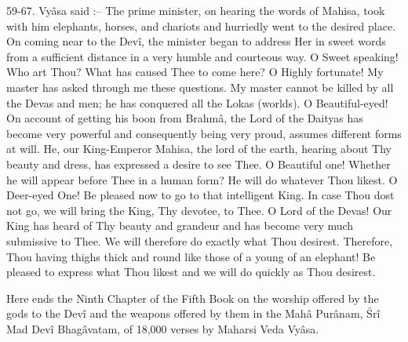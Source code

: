 59-67. Vy\^asa said :-- The prime minister, on hearing the words of Mahisa, took with him elephants, horses, and chariots and hurriedly went to the desired place. On coming near to the Dev\^i, the minister began to address Her in sweet words from a sufficient distance in a very humble and courteous way. O Sweet speaking! Who art Thou? What has caused Thee to come here? O Highly fortunate! My master has asked through me these questions. My master cannot be killed by all the Devas and men; he has conquered all the Lokas (worlds). O Beautiful-eyed! On account of getting his boon from Brahm\^a, the Lord of the Daityas has become very powerful and consequently being very proud, assumes different forms at will. He, our King-Emperor Mahisa, the lord of the earth, hearing about Thy beauty and dress, has expressed a desire to see Thee. O Beautiful one! Whether he will appear before Thee in a human form? He will do whatever Thou likest. O Deer-eyed One! Be pleased now to go to that intelligent King. In case Thou dost not go, we will bring the King, Thy devotee, to Thee. O Lord of the Devas! Our King has heard of Thy beauty and grandeur and has become very much submissive to Thee. We will therefore do exactly what Thou desirest. Therefore, Thou having thighs thick and round like those of a young of an elephant! Be pleased to express what Thou likest and we will do quickly as Thou desirest.

Here ends the Ninth Chapter of the Fifth Book on the worship offered by the gods to the Dev\^i and the weapons offered by them in the Mah\^a Pur\^anam, \'Sr\^i Mad Dev\^i Bhag\^avatam, of 18,000 verses by Maharsi Veda Vy\^asa.

